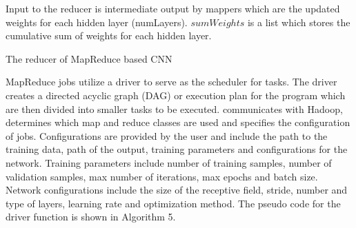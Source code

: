 \documentclass[12pt]{report}
\begin{document}
\hfill

\begin{algorithm}[H]
 Input to the reducer is intermediate output by mappers which are the updated
 weights for each hidden layer (numLayers). $sumWeights$ is a list which stores the cumulative sum of weights for each hidden layer. 

 \caption{The reducer of MapReduce based CNN}

\end{algorithm}

\hfill

MapReduce jobs utilize a driver to serve as the scheduler for tasks. The driver creates a directed acyclic graph (DAG) or execution plan for the program which are then divided into smaller tasks to be executed.  communicates with Hadoop, determines which map and reduce classes are used and specifies the configuration of jobs. Configurations are provided by the user and include the path to the training data, path of the output, training parameters and configurations for the network.  Training parameters include number of training samples, number of validation samples, max number of iterations, max epochs and batch size.  Network configurations include the size of the receptive field, stride, number and type of layers, learning rate and optimization method. The pseudo code for the driver function is shown in Algorithm 5.
\end{document}
